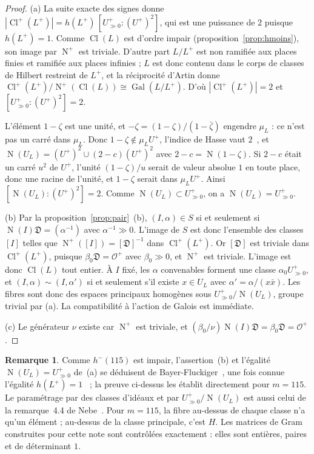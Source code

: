 \documentclass[11pt,a4paper]{amsart}
\theoremstyle{plain}
\theoremstyle{definition}
\newtheorem{remarque}[theoreme]{Remarque}
\numberwithin{equation}{section}
\newcommand{\Op}{\mathcal{O}^{+}}
\newcommand{\Dif}{\mathfrak{D}}
\DeclareMathOperator{\Nm}{N}
\DeclareMathOperator{\Cl}{Cl}
\DeclareMathOperator{\Gal}{Gal}
\newcommand{\Clp}{\Cl^{+}}
\newcommand{\Up}{U^{+}}
\newcommand{\Upp}{U^{+}_{\gg0}}
\begin{document}
\begin{proof}
(a) La suite exacte des signes donne $|\Clp(L^+)|=h(L^+)\,[\Upp:(\Up)^2]$, qui est une puissance de $2$ puisque $h(L^+)=1$. Comme $\Cl(L)$ est d'ordre impair (proposition~\ref{prop:hmoins}), son image par $\Nm^+$ est triviale. D'autre part $L/L^+$ est non ramifiée aux places finies et ramifiée aux places infinies ; $L$ est donc contenu dans le corps de classes de Hilbert restreint de $L^+$, et la réciprocité d'Artin donne $\Clp(L^+)/\Nm^+(\Cl(L))\cong\Gal(L/L^+)$. D'où $|\Clp(L^+)|=2$ et $[\Upp:(\Up)^2]=2$.

L'élément $1-\zeta$ est une unité, et $-\zeta=(1-\zeta)/(1-\bar\zeta)$ engendre $\mu_L$ : ce n'est pas un carré dans $\mu_L$. Donc $1-\zeta\notin\mu_L\Up$, l'indice de Hasse vaut $2$~\cite[th.~4.12, cor.~4.13]{Was97}, et $\Nm(U_L)=(\Up)^2\cup(2-c)(\Up)^2$ avec $2-c=\Nm(1-\zeta)$. Si $2-c$ était un carré $u^2$ de $\Up$, l'unité $(1-\zeta)/u$ serait de valeur absolue $1$ en toute place, donc une racine de l'unité, et $1-\zeta$ serait dans $\mu_L\Up$. Ainsi $[\Nm(U_L):(\Up)^2]=2$. Comme $\Nm(U_L)\subset\Upp$, on a $\Nm(U_L)=\Upp$.

(b) Par la proposition~\ref{prop:pair}~(b), $(I,\alpha)\in S$ si et seulement si $\Nm(I)\Dif=(\alpha^{-1})$ avec $\alpha^{-1}\gg0$. L'image de $S$ est donc l'ensemble des classes $[I]$ telles que $\Nm^+([I])=[\Dif]^{-1}$ dans $\Clp(L^+)$. Or $[\Dif]$ est triviale dans $\Clp(L^+)$, puisque $\beta_0\Dif=\Op$ avec $\beta_0\gg0$, et $\Nm^+$ est triviale. L'image est donc $\Cl(L)$ tout entier. À $I$ fixé, les $\alpha$ convenables forment une classe $\alpha_0\Upp$, et $(I,\alpha)\sim(I,\alpha')$ si et seulement s'il existe $x\in U_L$ avec $\alpha'=\alpha/(x\bar x)$. Les fibres sont donc des espaces principaux homogènes sous $\Upp/\Nm(U_L)$, groupe trivial par (a). La compatibilité à l'action de Galois est immédiate.

(c) Le générateur $\nu$ existe car $\Nm^+$ est triviale, et $(\beta_0/\nu)\Nm(I)\Dif=\beta_0\Dif=\Op$.
\end{proof}

\begin{remarque}
Comme $h^-(115)$ est impair, l'assertion~(b) et l'égalité $\Nm(U_L)=\Upp$ de~(a) se déduisent de Bayer-Fluckiger~\cite[prop.~3.1 et lemme~3.2~a)]{Bay84}, une fois connue l'égalité $h(L^+)=1$~\cite{Mil14} ; la preuve ci-dessus les établit directement pour $m=115$. Le paramétrage par des classes d'idéaux et par $\Upp/\Nm(U_L)$ est aussi celui de la remarque~4.4 de Nebe~\cite{Neb16}. Pour $m=115$, la fibre au-dessus de chaque classe n'a qu'un élément ; au-dessus de la classe principale, c'est $H$. Les matrices de Gram construites pour cette note sont contrôlées exactement : elles sont entières, paires et de déterminant $1$.
\end{remarque}
\end{document}
